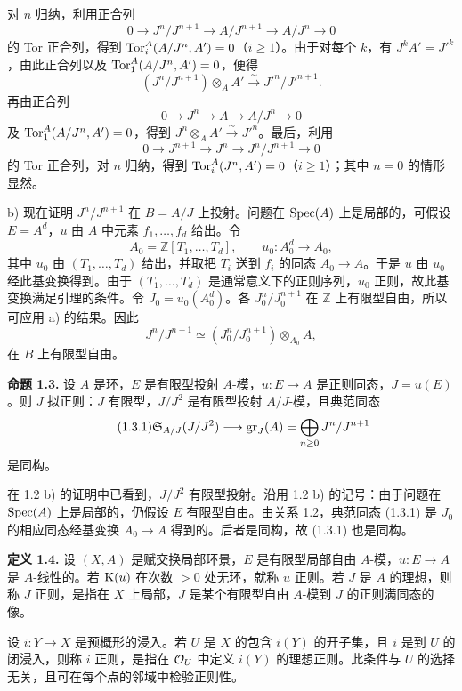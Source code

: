 对 \(n\) 归纳，利用正合列
\[
 0\longrightarrow J^n/J^{n+1}\longrightarrow A/J^{n+1}
 \longrightarrow A/J^n\longrightarrow0
\]
的 Tor 正合列，得到 \(\operatorname{Tor}_i^A(A/J^n,A')=0\)（\(i\geq1\)）。由于对每个 \(k\)，有 \(J^kA'=J'^k\)，由此正合列以及 \(\operatorname{Tor}_1^A(A/J^n,A')=0\)，便得
\[
 (J^n/J^{n+1})\otimes_A A'\xrightarrow{\sim}J'^n/J'^{n+1}.
\]
再由正合列
\[
 0\longrightarrow J^n\longrightarrow A\longrightarrow A/J^n\longrightarrow0
\]
及 \(\operatorname{Tor}_1^A(A/J^n,A')=0\)，得到 \(J^n\otimes_A A'\xrightarrow{\sim}J'^n\)。最后，利用
\[
 0\longrightarrow J^{n+1}\longrightarrow J^n\longrightarrow J^n/J^{n+1}
 \longrightarrow0
\]
的 Tor 正合列，对 \(n\) 归纳，得到 \(\operatorname{Tor}_i^A(J^n,A')=0\)（\(i\geq1\)）；其中 \(n=0\) 的情形显然。

b) 现在证明 \(J^n/J^{n+1}\) 在 \(B=A/J\) 上投射。问题在 \(\operatorname{Spec}(A)\) 上是局部的，可假设 \(E=A^d\)，\(u\) 由 \(A\) 中元素 \(f_1,\ldots,f_d\) 给出。令
\[
 A_0=\mathbb Z[T_1,\ldots,T_d],
 \qquad u_0:A_0^d\longrightarrow A_0,
\]
其中 \(u_0\) 由 \((T_1,\ldots,T_d)\) 给出，并取把 \(T_i\) 送到 \(f_i\) 的同态 \(A_0\to A\)。于是 \(u\) 由 \(u_0\) 经此基变换得到。由于 \((T_1,\ldots,T_d)\) 是通常意义下的正则序列，\(u_0\) 正则，故此基变换满足引理的条件。令 \(J_0=u_0(A_0^d)\)。各 \(J_0^n/J_0^{n+1}\) 在 \(\mathbb Z\) 上有限型自由，所以可应用 a) 的结果。因此
\[
 J^n/J^{n+1}\simeq(J_0^n/J_0^{n+1})\otimes_{A_0}A,
\]
在 \(B\) 上有限型自由。

\textbf{命题 1.3.} 设 \(A\) 是环，\(E\) 是有限型投射 \(A\)-模，\(u:E\to A\) 是正则同态，\(J=u(E)\)。则 \(J\) 拟正则：\(J\) 有限型，\(J/J^2\) 是有限型投射 \(A/J\)-模，且典范同态
\begin{equation}\tag{1.3.1}
 \mathfrak S_{A/J}(J/J^2)\longrightarrow \operatorname{gr}_J(A)=\bigoplus_{n\ge0}J^n/J^{n+1}
\end{equation}
是同构。

在 1.2 b) 的证明中已看到，\(J/J^2\) 有限型投射。沿用 1.2 b) 的记号：由于问题在 \(\operatorname{Spec}(A)\) 上是局部的，仍假设 \(E\) 有限型自由。由关系 1.2，典范同态 (1.3.1) 是 \(J_0\) 的相应同态经基变换 \(A_0\to A\) 得到的。后者是同构，故 (1.3.1) 也是同构。

\textbf{定义 1.4.} 设 \((X,A)\) 是赋交换局部环景，\(E\) 是有限型局部自由 \(A\)-模，\(u:E\to A\) 是 \(A\)-线性的。若 \(\mathrm K(u)\) 在次数 \(>0\) 处无环，就称 \(u\) 正则。若 \(J\) 是 \(A\) 的理想，则称 \(J\) 正则，是指在 \(X\) 上局部，\(J\) 是某个有限型自由 \(A\)-模到 \(J\) 的正则满同态的像。

设 \(i:Y\to X\) 是预概形的浸入。若 \(U\) 是 \(X\) 的包含 \(i(Y)\) 的开子集，且 \(i\) 是到 \(U\) 的闭浸入，则称 \(i\) 正则，是指在 \(\mathcal O_U\) 中定义 \(i(Y)\) 的理想正则。此条件与 \(U\) 的选择无关，且可在每个点的邻域中检验正则性。

